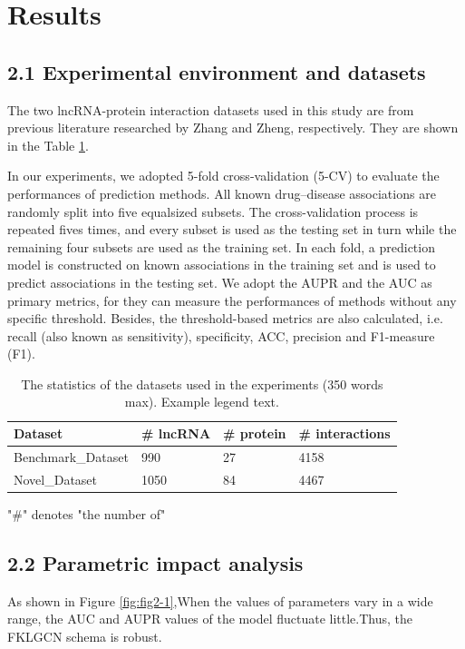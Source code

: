 \documentclass[fleqn,10pt]{wlscirep}
\begin{document}
\section*{Results}
\subsection*{2.1 Experimental environment and datasets}
The two lncRNA-protein interaction datasets used in this study are from previous literature researched by Zhang\cite{Zhang2018}  and Zheng\cite{Zheng2017a}, respectively. They are shown in the Table \ref{tab:datasets}.

In our experiments, we adopted 5-fold cross-validation (5-CV)
to evaluate the performances of prediction methods. All known drug–disease associations are randomly split into five equalsized subsets. The cross-validation process is repeated fives times, and every subset is used as the testing set in turn while the remaining four subsets are used as the training set. In each fold, a prediction model is constructed on known associations in the training set and is used to predict associations in the testing set. We adopt the AUPR and the AUC as primary metrics, for they can measure the performances of methods without any specific threshold. Besides, the threshold-based metrics are also calculated, i.e. recall (also known as sensitivity), specificity, ACC, precision and F1-measure (F1).


\begin{table}[ht]
\centering
\caption{\label{tab:datasets} The statistics of the datasets used in the experiments (350 words max). Example legend text.}
\begin{threeparttable}[b]
\begin{tabular}{|l|l|l|l|}
\hline
Dataset & \# lncRNA & \# protein & \# interactions \\
\hline
Benchmark_Dataset & 990 & 27 & 4158\\
\hline
Novel_Dataset & 1050 & 84 & 4467 \\
\hline
\end{tabular}
\begin{tablenotes}
     \item "\#" denotes "the number of"
     \end{tablenotes}
     \end{threeparttable}
\end{table}

\subsection*{2.2 Parametric impact analysis}
As shown in Figure \ref{fig:fig2-1},When the values of parameters vary in a wide range, the AUC and AUPR values of the model fluctuate little.Thus, the FKLGCN schema is robust.
\end{document}
